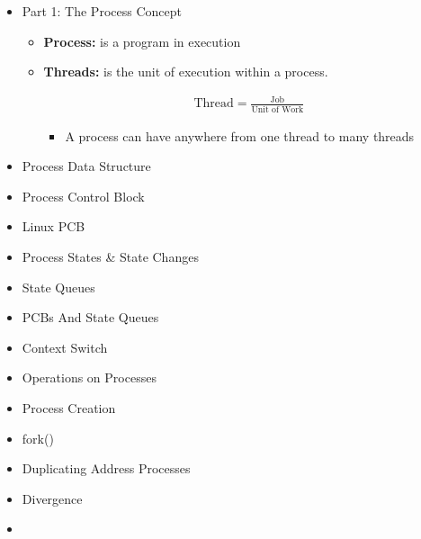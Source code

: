 \documentclass[12pt]{article}
\begin{document}
\begin{itemize}
    \item Part 1: The Process Concept
    \begin{itemize}
        \item \textbf{Process:} is a program in execution
        \item \textbf{Threads:} is the unit of execution within a process.

        \begin{align}
            \text{Thread} = \frac{\text{Job}}{\text{Unit of Work}}
        \end{align}

        \begin{itemize}
            \item A process can have anywhere from one thread to many threads
        \end{itemize}
    \end{itemize}

    \item Process Data Structure
    \item Process Control Block
    \item Linux PCB
    \item Process States \& State Changes
    \item State Queues
    \item PCBs And State Queues
    \item Context Switch
    \item Operations on Processes
    \item Process Creation
    \item fork()
    \item Duplicating Address Processes
    \item Divergence
    \item
\end{itemize}
\end{document}
